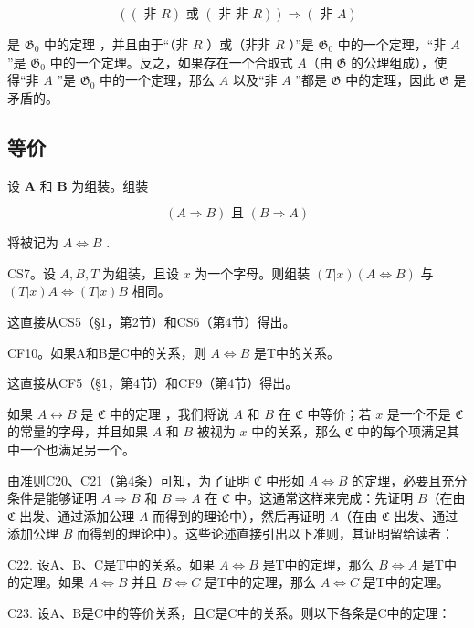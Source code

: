 \[
((\text { 非 } R) \text { 或 } (\text { 非   非 } R)) \Longrightarrow (\text { 非 } A)
\]

是 \(\mathfrak{G}_0\) 中的定理 ，并且由于``（非 \(R\) ）或（非非 \(R\) ）''是 \(\mathfrak{G}_0\) 中的一个定理，``非 \(A\) ''是 \(\mathfrak{G}_0\) 中的一个定理。反之，如果存在一个合取式 \(A\)（由 \(\mathfrak{G}\) 的公理组成），使得``非 \(A\) ''是 \(\mathfrak{G}_0\) 中的一个定理，那么 \(A\) 以及``非 \(A\) ''都是 \(\mathfrak{G}\) 中的定理，因此 \(\mathfrak{G}\) 是矛盾的。

\subsection{等价}

设 \(\pmb{A}\) 和 \(\pmb{B}\) 为组装。组装

\[
(A \Longrightarrow B) \text { 且 } (B \Longrightarrow A)
\]

将被记为 \(A \Longleftrightarrow B\) .

CS7。设 \(A, B, T\) 为组装，且设 \(x\) 为一个字母。则组装 \((T|x)(A \Longleftrightarrow B)\) 与 \((T|x)A \Longleftrightarrow (T|x)B\) 相同。

这直接从CS5（§1，第2节）和CS6（第4节）得出。

CF10。如果A和B是C中的关系，则 \(A \Longleftrightarrow B\) 是T中的关系。

这直接从CF5（§1，第4节）和CF9（第4节）得出。

如果 \(A \leftrightarrow B\) 是 \(\mathfrak{C}\) 中的定理 ，我们将说 \(A\) 和 \(B\) 在 \(\mathfrak{C}\) 中等价；若 \(x\) 是一个不是 \(\mathfrak{C}\) 的常量的字母，并且如果 \(A\) 和 \(B\) 被视为 \(x\) 中的关系，那么 \(\mathfrak{C}\) 中的每个项满足其中一个也满足另一个。

由准则C20、C21（第4条）可知，为了证明 \(\mathfrak{C}\) 中形如 \(A \Longleftrightarrow B\) 的定理，必要且充分条件是能够证明 \(A \Longrightarrow B\) 和 \(B \Longrightarrow A\) 在 \(\mathfrak{C}\) 中。这通常这样来完成：先证明 \(B\)（在由 \(\mathfrak{C}\) 出发、通过添加公理 \(A\) 而得到的理论中），然后再证明 \(A\)（在由 \(\mathfrak{C}\) 出发、通过添加公理 \(B\) 而得到的理论中）。这些论述直接引出以下准则，其证明留给读者：

C22. 设A、B、C是T中的关系。如果 \(A \Longleftrightarrow B\) 是T中的定理，那么 \(B \Longleftrightarrow A\) 是T中的定理。如果 \(A \Longleftrightarrow B\) 并且 \(B \Longleftrightarrow C\) 是T中的定理，那么 \(A \Longleftrightarrow C\) 是T中的定理。

C23. 设A、B是C中的等价关系，且C是C中的关系。则以下各条是C中的定理：


